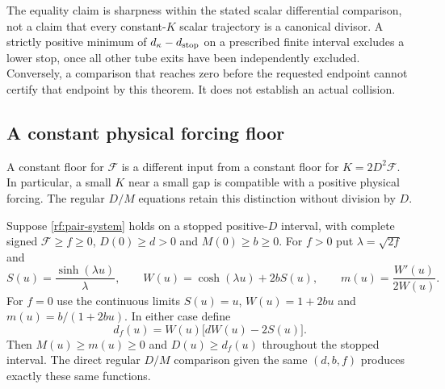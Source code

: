 The equality claim is sharpness within the stated scalar differential
comparison, not a claim that every constant-$K$ scalar trajectory is a
canonical divisor. A strictly positive minimum of $d_\kappa-d_{\rm stop}$
on a prescribed finite interval excludes a lower stop, once all other
tube exits have been independently excluded. Conversely, a comparison
that reaches zero before the requested endpoint cannot certify that
endpoint by this theorem. It does not establish an actual collision.

\subsection{A constant physical forcing floor}

A constant floor for $\mathcal F$ is a different input from a constant
floor for $K=2D^2\mathcal F$. In particular, a small $K$ near a small
gap is compatible with a positive physical forcing. The regular
$D/M$ equations retain this distinction without division by $D$.

\begin{theorem}
\label{rf:forcing-comparison}
Suppose \eqref{rf:pair-system} holds on a stopped positive-$D$ interval,
with complete signed $\mathcal F\ge f\ge0$, $D(0)\ge d>0$ and
$M(0)\ge b\ge0$. For $f>0$ put $\lambda=\sqrt{2f}$ and
\begin{equation}
 S(u)=\frac{\sinh(\lambda u)}{\lambda},\qquad
 W(u)=\cosh(\lambda u)+2bS(u),\qquad
 m(u)=\frac{W'(u)}{2W(u)}.
 \label{rf:model-functions}
\end{equation}
For $f=0$ use the continuous limits $S(u)=u$,
$W(u)=1+2bu$ and $m(u)=b/(1+2bu)$. In either case define
\begin{equation}
 d_f(u)=W(u)\bigl[dW(u)-2S(u)\bigr].
 \label{rf:physical-forcing-model}
\end{equation}
Then $M(u)\ge m(u)\ge0$ and $D(u)\ge d_f(u)$ throughout the stopped
interval. The direct regular $D/M$ comparison given the same
$(d,b,f)$ produces exactly these same functions.
\end{theorem}

